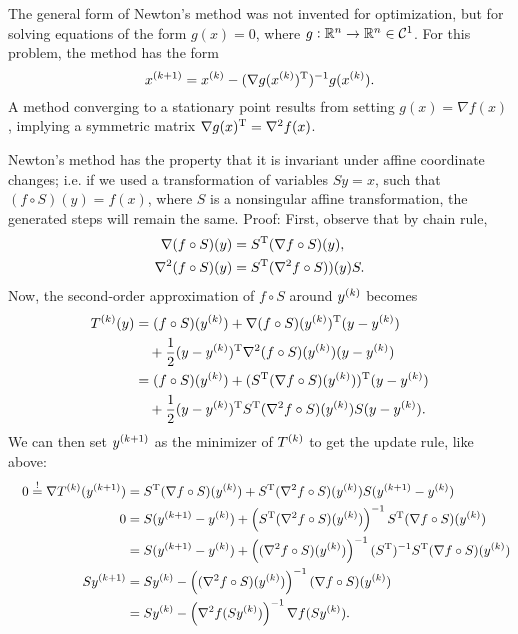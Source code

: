 \documentclass{article}
\begin{document}
\label{s:newton-equations}

The general form of Newton's method was not invented for optimization, but for solving equations of
the form \(g(x) = 0\), where \(g: \RR^n \to \RR^n \in \mathcal{C}^1\).  For this problem, the method
has the form
\begin{equation*}
  \kth[k+1]{x} = \kth{x} - (\T{\nabla g(\kth{x})})^{-1} g(\kth{x}).
\end{equation*}
A method converging to a stationary point results from setting \(g(x) = \nabla f(x)\), implying a
symmetric matrix \(\T{\nabla g(x)} = \nabla^2 f(x)\).


\label{s:newton-scale}

Newton's method has the property that it is invariant under affine coordinate changes; i.e. if we
used a transformation of variables \(Sy = x\), such that \((f \circ S)(y) = f(x)\), where \(S\) is a
nonsingular affine transformation, the generated steps will remain the same.  Proof: First, observe
that by chain rule,
\begin{align*}
  \nabla (f \circ S)(y) &= \T{S}(\nabla f \circ S)(y), \\
  \nabla^2 (f \circ S)(y) &= \T{S}(\nabla^2 f \circ S))(y)S.
\end{align*}
Now, the second-order approximation of \(f \circ S\) around \(\kth{y}\) becomes
\begin{align*}
  \kth{T}(y) &= (f \circ S)(\kth{y}) + \T{\nabla (f \circ S)(\kth{y})}(y - \kth{y}) \\
             &\quad + \frac{1}{2} \T{(y - \kth{y})} \nabla^2 (f \circ S)(\kth{y}) (y - \kth{y}) \\
             &= (f \circ S)(\kth{y}) + \T{(\T{S}(\nabla f \circ S)(\kth{y}))}(y - \kth{y}) \\
             &\quad + \frac{1}{2} \T{(y - \kth{y})}
               \T{S}(\nabla^2 f \circ S)(\kth{y})S (y - \kth{y}).
\end{align*}
We can then set \(\kth[k+1]{y}\) as the minimizer of \(\kth{T}\) to get the update rule, like above:
\begin{align*}
  & & 0 \overset{!}{=} \nabla \kth{T}(\kth[k+1]{y}) &= \T{S}(\nabla f \circ S)(\kth{y})
                                                      + \T{S}(\nabla^2 f \circ S)(\kth{y})S
                                                      (\kth[k+1]{y} - \kth{y}) \\
  & & 0 &= S(\kth[k+1]{y} - \kth{y}) + \left( \T{S}(\nabla^2 f \circ S)(\kth{y}) \right)^{-1}
          \T{S}(\nabla f \circ S)(\kth{y}) \\
  & & &= S(\kth[k+1]{y} - \kth{y}) + \left( (\nabla^2 f \circ S)(\kth{y}) \right)^{-1} (\T{S})^{-1}
          \T{S}(\nabla f \circ S)(\kth{y}) \\
  & & S\kth[k+1]{y} &= S\kth{y} - \left( (\nabla^2 f \circ S)(\kth{y}) \right)^{-1}
                      (\nabla f \circ S)(\kth{y}) \\
  & & &= S\kth{y} - \left( \nabla^2 f(S\kth{y}) \right)^{-1}
                      \nabla f(S\kth{y}).
\end{align*}
\end{document}
